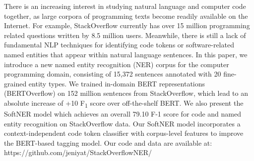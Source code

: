 There is an increasing interest in studying natural language and computer code together, as large corpora of programming texts become readily available on the Internet. For example, StackOverflow currently has over 15 million programming related questions written by 8.5 million users. Meanwhile, there is still a lack of fundamental NLP techniques for identifying code tokens or software-related named entities that appear within natural language sentences. In this paper, we introduce a new named entity recognition (NER) corpus for the computer programming domain, consisting of 15,372 sentences annotated with 20 fine-grained entity types. We trained in-domain BERT representations (BERTOverflow) on 152 million sentences from StackOverflow, which lead to an absolute increase of +10 F\textsubscript{1} score over off-the-shelf BERT. We also present the SoftNER model which achieves an overall 79.10 F-1 score for code and named entity recognition on StackOverflow data. Our SoftNER model incorporates a context-independent code token classifier with corpus-level features to improve the BERT-based tagging model. Our code and data are available at: https://github.com/jeniyat/StackOverflowNER/
